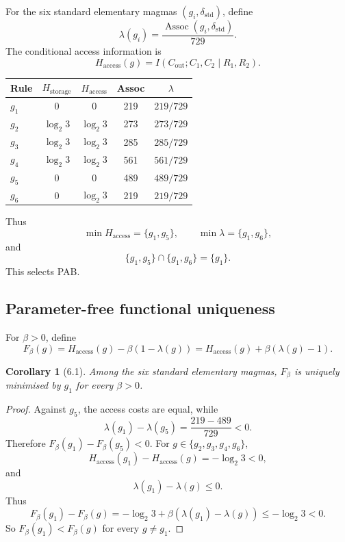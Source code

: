 \documentclass[11pt]{article}
\newtheorem*{corollarystar}{Corollary}
\begin{document}
For the six standard elementary magmas \((g_i,\delta_{\mathrm{std}})\), define
\[
\lambda(g_i)=\frac{\operatorname{Assoc}(g_i,\delta_{\mathrm{std}})}{729}.
\]
The conditional access information is
\[
H_{\mathrm{access}}(g)=I(C_{\mathrm{out}};C_1,C_2\mid R_1,R_2).
\]

\begin{center}
\small
\begin{tabular}{@{}lcccc@{}}
Rule & \(H_{\mathrm{storage}}\) & \(H_{\mathrm{access}}\) & Assoc & \(\lambda\) \\
\midrule
\(g_1\) & 0 & 0 & 219 & \(219/729\) \\
\(g_2\) & \(\log_2 3\) & \(\log_2 3\) & 273 & \(273/729\) \\
\(g_3\) & \(\log_2 3\) & \(\log_2 3\) & 285 & \(285/729\) \\
\(g_4\) & \(\log_2 3\) & \(\log_2 3\) & 561 & \(561/729\) \\
\(g_5\) & 0 & 0 & 489 & \(489/729\) \\
\(g_6\) & 0 & \(\log_2 3\) & 219 & \(219/729\) \\
\end{tabular}
\end{center}

Thus
\[
\min H_{\mathrm{access}}=\{g_1,g_5\},
\qquad
\min\lambda=\{g_1,g_6\},
\]
and
\[
\{g_1,g_5\}\cap\{g_1,g_6\}=\{g_1\}.
\]
This selects PAB.

\subsection{Parameter-free functional uniqueness}

For \(\beta>0\), define
\[
F_\beta(g)=H_{\mathrm{access}}(g)-\beta(1-\lambda(g))
=H_{\mathrm{access}}(g)+\beta(\lambda(g)-1).
\]

\begin{corollarystar}[6.1]
Among the six standard elementary magmas,
\(F_\beta\) is uniquely minimised by \(g_1\) for every \(\beta>0\).

\end{corollarystar}
\begin{proof}
Against \(g_5\), the access costs are equal, while
\[
\lambda(g_1)-\lambda(g_5)=\frac{219-489}{729}<0.
\]
Therefore \(F_\beta(g_1)-F_\beta(g_5)<0\). For
\(g\in\{g_2,g_3,g_4,g_6\}\),
\[
H_{\mathrm{access}}(g_1)-H_{\mathrm{access}}(g)=-\log_2 3<0,
\]
and
\[
\lambda(g_1)-\lambda(g)\le0.
\]
Thus
\[
F_\beta(g_1)-F_\beta(g)
=-\log_2 3+
\beta(\lambda(g_1)-\lambda(g))
\le -\log_2 3<0.
\]
So \(F_\beta(g_1)<F_\beta(g)\) for every \(g\ne g_1\).

\end{proof}
\end{document}

